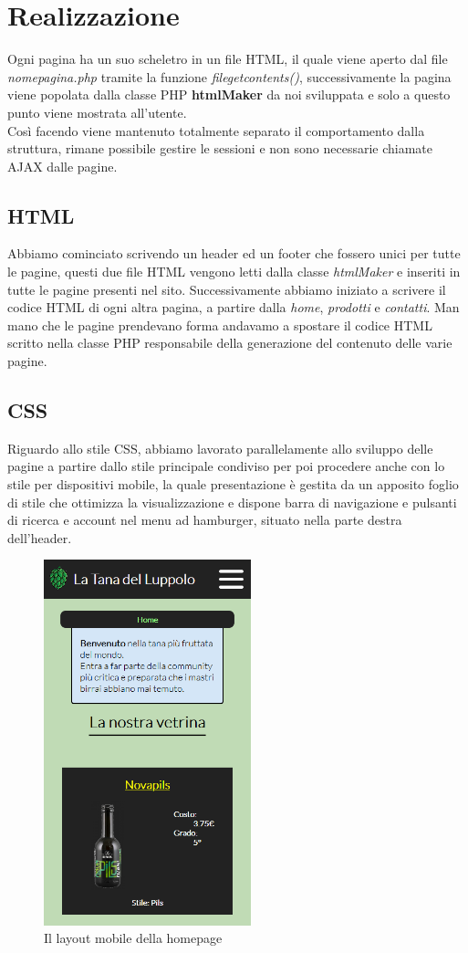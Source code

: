 \section{Realizzazione}
Ogni pagina ha un suo scheletro in un file HTML, il quale viene aperto dal file \textit{nome\textunderscore pagina.php} tramite la funzione \textit{file\textunderscore get\textunderscore contents()}, successivamente la pagina viene popolata dalla classe PHP \textbf{htmlMaker} da noi sviluppata e solo a questo punto viene mostrata all'utente.\\
Così facendo viene mantenuto totalmente separato il comportamento dalla struttura, rimane possibile gestire le sessioni e non sono necessarie chiamate AJAX dalle pagine.
\subsection{HTML}
Abbiamo cominciato scrivendo un header ed un footer che fossero unici per tutte le pagine, questi due file HTML vengono letti dalla classe \textit{htmlMaker} e inseriti in tutte le pagine presenti nel sito. Successivamente abbiamo iniziato a scrivere il codice HTML di ogni altra pagina, a partire dalla \textit{home}, \textit{prodotti} e \textit{contatti}. Man mano che le pagine prendevano forma andavamo a spostare il codice HTML scritto nella classe PHP responsabile della generazione del contenuto delle varie pagine.
\subsection{CSS}
Riguardo allo stile CSS, abbiamo lavorato parallelamente allo sviluppo delle pagine a partire dallo stile principale condiviso per poi procedere anche con lo stile per dispositivi mobile, la quale presentazione è gestita da un apposito foglio di stile che ottimizza la visualizzazione e dispone barra di navigazione e pulsanti di ricerca e account nel menu ad hamburger, situato nella parte destra dell'header.


\begin{figure}[H]
	\centering
	\includegraphics[width=6cm]{utility/home_mobile.png}
	\caption{Il layout mobile della homepage}
\end{figure}

